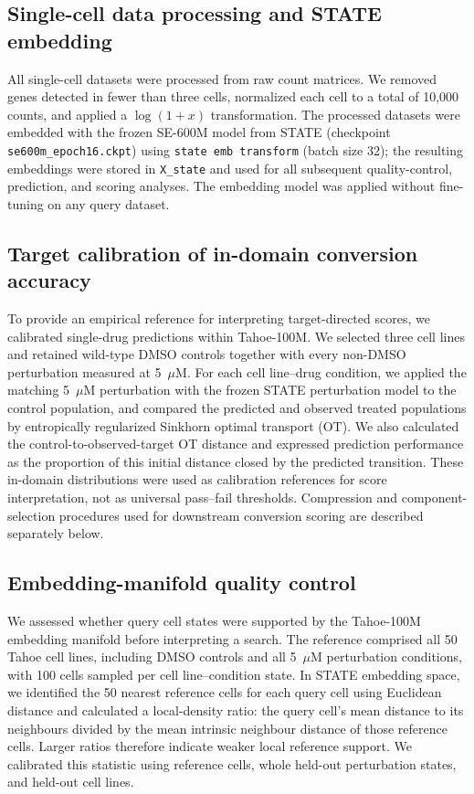 \documentclass[11pt,a4paper]{article}
\begin{document}
\subsection{Single-cell data processing and STATE embedding}
All single-cell datasets were processed from raw count matrices. We removed genes detected in fewer than three cells, normalized each cell to a total of 10,000 counts, and applied a $\log(1+x)$ transformation. The processed datasets were embedded with the frozen SE-600M model from STATE (checkpoint \texttt{se600m\_epoch16.ckpt}) using \texttt{state emb transform} (batch size 32); the resulting embeddings were stored in \texttt{X\_state} and used for all subsequent quality-control, prediction, and scoring analyses. The embedding model was applied without fine-tuning on any query dataset.

\subsection{Target calibration of in-domain conversion accuracy}
To provide an empirical reference for interpreting target-directed scores, we calibrated single-drug predictions within Tahoe-100M. We selected three cell lines and retained wild-type DMSO controls together with every non-DMSO perturbation measured at 5~$\mu$M. For each cell line--drug condition, we applied the matching 5~$\mu$M perturbation with the frozen STATE perturbation model to the control population, and compared the predicted and observed treated populations by entropically regularized Sinkhorn optimal transport (OT). We also calculated the control-to-observed-target OT distance and expressed prediction performance as the proportion of this initial distance closed by the predicted transition. These in-domain distributions were used as calibration references for score interpretation, not as universal pass--fail thresholds. Compression and component-selection procedures used for downstream conversion scoring are described separately below.

\subsection{Embedding-manifold quality control}
We assessed whether query cell states were supported by the Tahoe-100M embedding manifold before interpreting a search. The reference comprised all 50 Tahoe cell lines, including DMSO controls and all 5~$\mu$M perturbation conditions, with 100 cells sampled per cell line--condition state. In STATE embedding space, we identified the 50 nearest reference cells for each query cell using Euclidean distance and calculated a local-density ratio: the query cell's mean distance to its neighbours divided by the mean intrinsic neighbour distance of those reference cells. Larger ratios therefore indicate weaker local reference support. We calibrated this statistic using reference cells, whole held-out perturbation states, and held-out cell lines.
\end{document}
